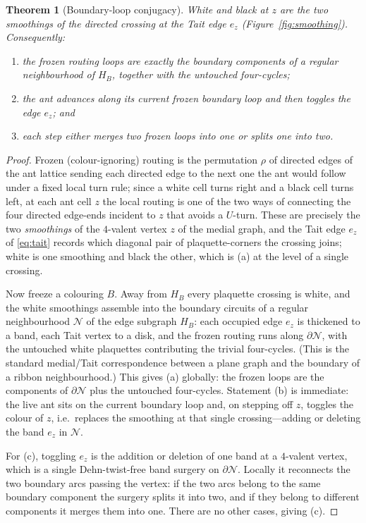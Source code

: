 \documentclass[11pt,reqno]{amsart}
\theoremstyle{plain}
\newtheorem{theorem}{Theorem}[section]
\theoremstyle{definition}
\begin{document}
\begin{theorem}[Boundary-loop conjugacy]\label{thm:conjugacy}
White and black at $z$ are the two smoothings of the directed crossing at the Tait
edge $e_z$ \textup{(Figure~\ref{fig:smoothing})}. Consequently:
\begin{enumerate}[label=\textup{(\alph*)}]
\item the frozen routing loops are exactly the boundary components of a regular
neighbourhood of $H_B$, together with the untouched four-cycles;
\item the ant advances along its current frozen boundary loop and then toggles the
edge $e_z$; and
\item each step either merges two frozen loops into one or splits one into two.
\end{enumerate}
\end{theorem}

\begin{proof}
Frozen (colour-ignoring) routing is the permutation $\rho$ of directed edges of the
ant lattice sending each directed edge to the next one the ant would follow under a
fixed local turn rule; since a white cell turns right and a black cell turns left, at
each ant cell $z$ the local routing is one of the two ways of connecting the four
directed edge-ends incident to $z$ that avoids a $U$-turn. These are precisely the two
\emph{smoothings} of the $4$-valent vertex $z$ of the medial graph, and the Tait edge
$e_z$ of \eqref{eq:tait} records which diagonal pair of plaquette-corners the crossing
joins; white is one smoothing and black the other, which is (a) at the level of a
single crossing.

Now freeze a colouring $B$. Away from $H_B$ every plaquette crossing is white, and the
white smoothings assemble into the boundary circuits of a regular neighbourhood $\mathcal{N}$
of the edge subgraph $H_B$: each occupied edge $e_z$ is thickened to a band, each Tait
vertex to a disk, and the frozen routing runs along $\partial\mathcal{N}$, with the untouched
white plaquettes contributing the trivial four-cycles. (This is the standard medial/Tait
correspondence between a plane graph and the boundary of a ribbon neighbourhood.) This
gives (a) globally: the frozen loops are the components of $\partial\mathcal{N}$ plus the
untouched four-cycles. Statement (b) is immediate: the live ant sits on the current
boundary loop and, on stepping off $z$, toggles the colour of $z$, i.e.\ replaces the
smoothing at that single crossing---adding or deleting the band $e_z$ in $\mathcal{N}$.

For (c), toggling $e_z$ is the addition or deletion of one band at a $4$-valent
vertex, which is a single Dehn-twist-free band surgery on $\partial\mathcal{N}$. Locally it
reconnects the two boundary arcs passing the vertex: if the two arcs belong to the same
boundary component the surgery splits it into two, and if they belong to different
components it merges them into one. There are no other cases, giving (c).
\end{proof}
\end{document}
